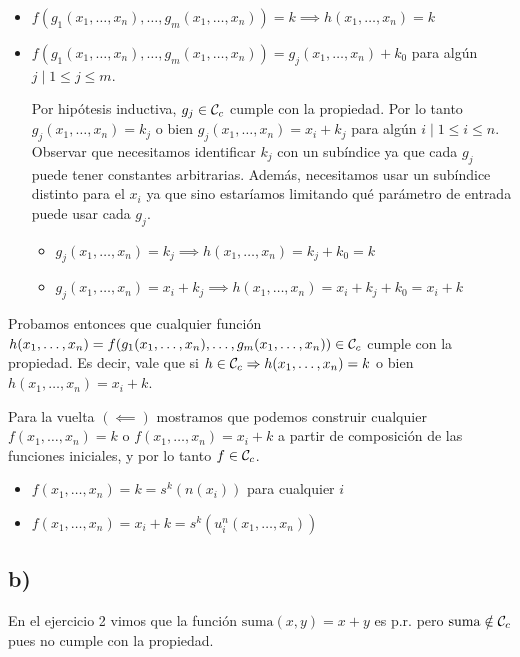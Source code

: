 \begin{itemize}
    \item $f(g_1(x_1, \dots, x_n), \dots, g_m(x_1, \dots, x_n)) = k \implies h(x_1, \dots, x_n) = k$

    \item $f(g_1(x_1, \dots, x_n), \dots, g_m(x_1, \dots, x_n)) = g_j(x_1, \dots, x_n) + k_0$ para algún $j \mid 1 \leq j \leq m$.

    Por hipótesis inductiva, $g_j \in \mathcal{C}_c$ cumple con la propiedad. Por lo tanto $g_j(x_1, \dots, x_n) = k_j$ o bien $g_j(x_1, \dots, x_n) = x_i + k_j$ para algún $i \mid 1 \leq i \leq n$. Observar que necesitamos identificar $k_j$ con un subíndice ya que cada $g_j$ puede tener constantes arbitrarias. Además, necesitamos usar un subíndice distinto para el $x_i$ ya que sino estaríamos limitando qué parámetro de entrada puede usar cada $g_j$.

    \begin{itemize}
        \item $g_j(x_1, \dots, x_n) = k_j \implies h(x_1, \dots, x_n) = k_j + k_0 = k$
        \item $g_j(x_1, \dots, x_n) = x_i + k_j \implies h(x_1, \dots, x_n) = x_i + k_j + k_0 = x_i + k$
    \end{itemize}
\end{itemize}

Probamos entonces que cualquier función $h(x_1, \dots, x_n) = f(g_1(x_1, \dots, x_n), \dots, g_m(x_1, \dots, x_n)) \in \mathcal{C}_c$ cumple con la propiedad. Es decir, vale que si $h \in \mathcal{C}_c \Rightarrow h(x_1, \dots, x_n) = k$ o bien $h(x_1, \dots, x_n) = x_i + k$.

Para la vuelta $(\impliedby)$ mostramos que podemos construir cualquier $f(x_1, \dots, x_n) = k$ o $f(x_1, \dots, x_n) = x_i + k$ a partir de composición de las funciones iniciales, y por lo tanto $f \in \mathcal{C}_c$.

\begin{itemize}
    \item $f(x_1, \dots, x_n) = k = s^k(n(x_i))$ para cualquier $i$
    \item $f(x_1, \dots, x_n) = x_i + k = s^k(u^n_i(x_1, \dots, x_n))$
\end{itemize}

\subsection*{b)}

En el ejercicio 2 vimos que la función $\text{suma}(x, y) = x + y$ es p.r. pero $\text{suma} \notin \mathcal{C}_c$ pues no cumple con la propiedad.
